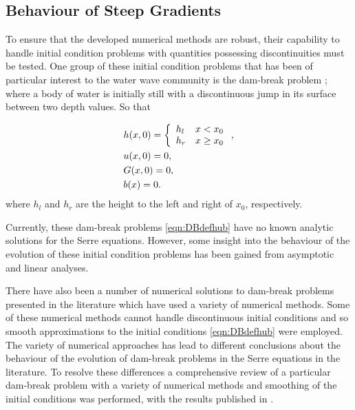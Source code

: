 \subsection{Behaviour of Steep Gradients}
To ensure that the developed numerical methods are robust, their capability to handle initial condition problems with quantities possessing discontinuities must be tested. One group of these initial condition problems that has been of particular interest to the water wave community is the dam-break problem \cite{El-etal-2006,Hank-etal-2010-2034,Mitsotakis-etal-2014,Mitsotakis-etal-2017,doCarmo-etal-2018-404}; where a body of water is initially still with a discontinuous jump in its surface between two depth values. So that

\begin{subequations}
	\begin{align}
	&h(x,0) =\left\lbrace \begin{array}{l r}
	h_l & x < x_0 \\
	h_r & x \ge x_0
	\end{array} \right., \\
	&u(x,0) = 0 , \\
	&G(x,0) = 0 , \\
	&b(x) = 0.
	\end{align}
	\label{eqn:DBdefhub}
\end{subequations} 
where $h_l$ and $h_r$ are the height to the left and right of $x_0$, respectively. 

Currently, these dam-break problems \eqref{eqn:DBdefhub} have no known analytic solutions for the Serre equations. However, some insight into the behaviour of the evolution of these initial condition problems has been gained from asymptotic \cite{El-etal-2006} and linear \cite{Dougalis-etal-2007} analyses. 

There have also been a number of numerical solutions to dam-break problems presented in the literature \cite{El-etal-2006,Hank-etal-2010-2034,Mitsotakis-etal-2014,Mitsotakis-etal-2017,doCarmo-etal-2018-404} which have used a variety of numerical methods. Some of these numerical methods cannot handle discontinuous initial conditions \cite{El-etal-2006,Mitsotakis-etal-2014,Mitsotakis-etal-2017,doCarmo-etal-2018-404} and so smooth approximations to the initial conditions \eqref{eqn:DBdefhub} were employed. The variety of numerical approaches has lead to different conclusions about the behaviour of the evolution of dam-break problems in the Serre equations in the literature. To resolve these differences a comprehensive review of a particular dam-break problem with a variety of numerical methods and smoothing of the initial conditions was performed, with the results published in \cite{Pitt-2018-61}. 

